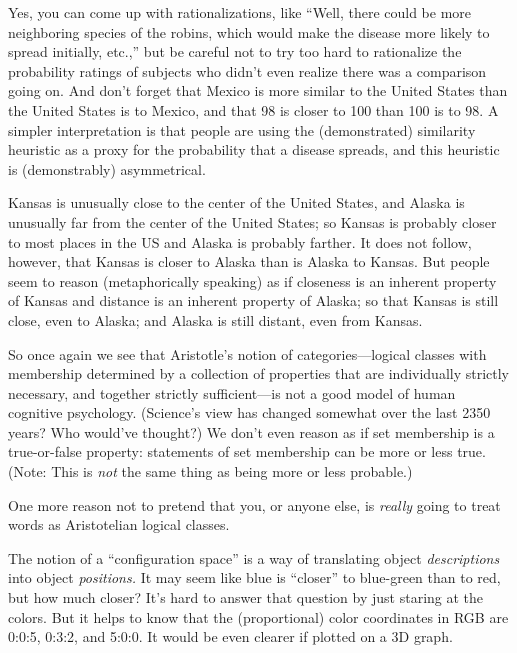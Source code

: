 {
 Yes, you can come up with rationalizations, like
``Well, there could be more neighboring species of the
robins, which would make the disease more likely to spread initially,
etc.,'' but be careful not to try too hard to
rationalize the probability ratings of subjects who
didn't even realize there was a comparison going on.
And don't forget that Mexico is more similar to the
United States than the United States is to Mexico, and that 98 is
closer to 100 than 100 is to 98. A simpler interpretation is that
people are using the (demonstrated) similarity heuristic as a proxy for
the probability that a disease spreads, and this heuristic is
(demonstrably) asymmetrical.}

{
 Kansas is unusually close to the center of the United States, and
Alaska is unusually far from the center of the United States; so Kansas
is probably closer to most places in the US and Alaska is probably
farther. It does not follow, however, that Kansas is closer to Alaska
than is Alaska to Kansas. But people seem to reason (metaphorically
speaking) as if closeness is an inherent property of Kansas and
distance is an inherent property of Alaska; so that Kansas is still
close, even to Alaska; and Alaska is still distant, even from Kansas.}

{
 So once again we see that Aristotle's notion of
categories---logical classes with membership determined by a collection
of properties that are individually strictly necessary, and together
strictly sufficient---is not a good model of human cognitive
psychology. (Science's view has changed somewhat over
the last 2350 years? Who would've thought?) We
don't even reason as if set membership is a
true-or-false property: statements of set membership can be more or
less true. (Note: This is \textit{not} the same thing as being more or
less probable.)}

{
 One more reason not to pretend that you, or anyone else, is
\textit{really} going to treat words as Aristotelian logical classes.}

\myendsectiontext


\bigskip


{
 The notion of a ``configuration
space'' is a way of translating object
\textit{descriptions} into object \textit{positions.} It may seem like
blue is ``closer'' to blue-green
than to red, but how much closer? It's hard to answer
that question by just staring at the colors. But it helps to know that
the (proportional) color coordinates in RGB are 0:0:5, 0:3:2, and
5:0:0. It would be even clearer if plotted on a 3D graph.}

